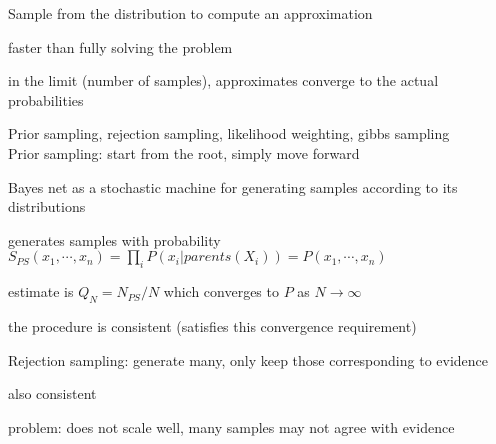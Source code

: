\documentclass[12pt]{article}
\begin{document}
\noindent
Sample from the distribution to compute an approximation

faster than fully solving the problem

in the limit (number of samples), approximates converge to the actual probabilities

\noindent
Prior sampling, rejection sampling, likelihood weighting, gibbs sampling\\

\noindent
Prior sampling: start from the root, simply move forward

Bayes net as a stochastic machine for generating samples according to its distributions

generates samples with probability $S_{PS}(x_1, \cdots, x_n) = \prod_i P(x_i| parents(X_i)) = P(x_1, \cdots, x_n)$

estimate is $Q_N = N_{PS}/N$ which converges to $P$ as $N \to \infty$

the procedure is consistent (satisfies this convergence requirement)

\noindent
Rejection sampling: generate many, only keep those corresponding to evidence

also consistent

problem: does not scale well, many samples may not agree with evidence
\end{document}
